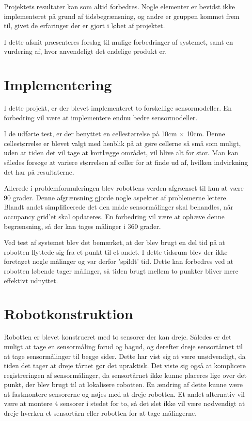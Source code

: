 Projektets resultater kan som altid forbedres.
Nogle elementer er bevidst ikke implementeret på grund af tidsbegrænsning, og andre er gruppen kommet frem til, givet de erfaringer der er gjort i løbet af projektet. 

I dette afsnit præsenteres forslag til mulige forbedringer af systemet, samt en vurdering af, hvor anvendeligt det endelige produkt er.

\section{Implementering}
I dette projekt, er der blevet implementeret to forskellige sensormodeller. 
En forbedring vil være at implementere endnu bedre sensormodeller.

I de udførte test, er der benyttet en cellestørrelse på 10cm $ \times $ 10cm.
Denne cellestørrelse er blevet valgt med henblik på at gøre cellerne så små som muligt, uden at tiden det vil tage at kortlægge området, vil blive alt for stor.
Man kan således forsøge at variere størrelsen af celler for at finde ud af, hvilken indvirkning det har på resultaterne.

Allerede i problemformuleringen blev robottens verden afgrænset til kun at være 90 grader. 
Denne afgrænsning gjorde nogle aspekter af problemerne lettere. 
Blandt andet simplificerede det den måde sensormålinger skal behandles, når occupancy grid'et skal opdateres.
En forbedring vil være at ophæve denne begrænsning, så der kan tages målinger i 360 grader.

Ved test af systemet blev det bemærket, at der blev brugt en del tid på at robotten flyttede sig fra et punkt til et andet.
I dette tidsrum blev der ikke foretaget nogle målinger og var derfor 'spildt' tid. 
Dette kan forbedres ved at robotten løbende tager målinger, så tiden brugt mellem to punkter bliver mere effektivt udnyttet.

\section{Robotkonstruktion}
Robotten er blevet konstrueret med to sensorer der kan dreje. 
Således er det muligt at tage en sensormåling forud og bagud, og derefter dreje sensortårnet til at tage sensormålinger til begge sider.
Dette har vist sig at være unødvendigt, da tiden det tager at dreje tårnet gør det upraktisk.
Det viste sig også at komplicere registreringen af sensormålinger, da sensortårnet ikke kunne placeres lige over det punkt, der blev brugt til at lokalisere robotten.
En ændring af dette kunne være at fastmontere sensorerne og nøjes med at dreje robotten.
Et andet alternativ vil være at montere 4 sensorer i stedet for to, så det slet ikke vil være nødvendigt at dreje hverken et sensortårn eller robotten for at tage målingerne.


